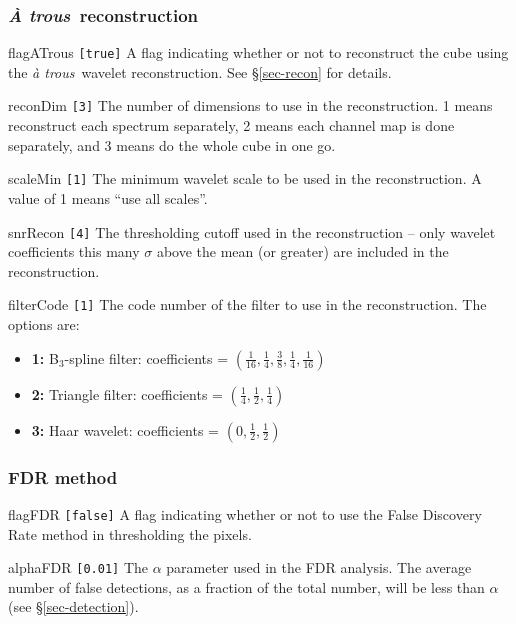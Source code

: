 \documentclass[12pt,a4paper]{article}
\newcommand{\atrous}{\textit{{\`a} trous}}
\newcommand{\Atrous}{\textit{{\`A} trous}}
\newcommand{\entrylabel}[1]{\mbox{\textsf{\bf{#1:}}}\hfil}
\newenvironment{entry}
        {\begin{list}{}%
                {\renewcommand{\makelabel}{\entrylabel}%
                        \setlength{\labelwidth}{30mm}%
                        \setlength{\labelsep}{5pt}%
                        \setlength{\itemsep}{2pt}%
                        \setlength{\parsep}{2pt}%
                        \setlength{\leftmargin}{35mm}%
                }%
        }%
{\end{list}}
\begin{document}
\subsubsection*{\Atrous\ reconstruction}
\begin{entry}
\item [flagATrous \texttt{[true]}] A flag indicating whether or not to
  reconstruct the cube using the \atrous\ wavelet
  reconstruction. See \S\ref{sec-recon} for details.
\item[reconDim \texttt{[3]}] The number of dimensions to use in the
  reconstruction. 1 means reconstruct each spectrum separately, 2
  means each channel map is done separately, and 3 means do the whole
  cube in one go.
\item[scaleMin \texttt{[1]}] The minimum wavelet scale to be used in the
  reconstruction. A value of 1 means ``use all scales''.
\item[snrRecon \texttt{[4]}] The thresholding cutoff used in the
  reconstruction -- only wavelet coefficients this many $\sigma$ above
  the mean (or greater) are included in the reconstruction. 
\item[filterCode \texttt{[1]}] The code number of the filter to use in
  the reconstruction. The options are:
  \begin{itemize}
  \item \textbf{1:} B$_3$-spline filter: coefficients = 
    $(\frac{1}{16}, \frac{1}{4}, \frac{3}{8}, \frac{1}{4}, \frac{1}{16})$
  \item \textbf{2:} Triangle filter: coefficients = 
    $(\frac{1}{4}, \frac{1}{2}, \frac{1}{4})$
  \item \textbf{3:} Haar wavelet: coefficients = 
    $(0, \frac{1}{2}, \frac{1}{2})$
  \end{itemize}
\end{entry}

\subsubsection*{FDR method}
\begin{entry}
\item[flagFDR \texttt{[false]}] A flag indicating whether or not to use
  the False Discovery Rate method in thresholding the pixels.
\item[alphaFDR \texttt{[0.01]}] The $\alpha$ parameter used in the FDR
analysis. The average number of false detections, as a fraction of the
total number, will be less than $\alpha$ (see \S\ref{sec-detection}).
\end{entry}
\end{document}
